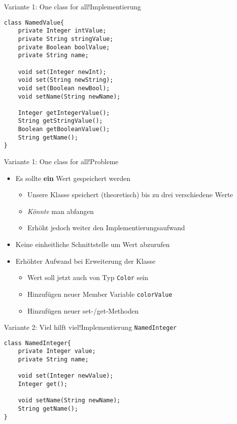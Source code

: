 \begin{frame}[fragile]{Variante 1: One class for all!}{Implementierung}
\lstset{style=javacode}
\begin{lstlisting}
class NamedValue{
    private Integer intValue;
    private String stringValue;
    private Boolean boolValue;
    private String name;

    void set(Integer newInt);
    void set(String newString);
    void set(Boolean newBool);
    void setName(String newName);

    Integer getIntegerValue();
    String getStringValue();
    Boolean getBooleanValue();
    String getName();
}
\end{lstlisting}
\end{frame}

\begin{frame}{Variante 1: One class for all!}{Probleme}
    \begin{itemize}
        \item Es sollte \textbf{ein} Wert gespeichert werden
            \begin{itemize}
                \item Unsere Klasse speichert (theoretisch) bis zu drei verschiedene Werte
                \item \textit{Könnte} man abfangen
                \item Erhöht jedoch weiter den Implementierungsaufwand
            \end{itemize}
            \item Keine einheitliche Schnittstelle um Wert abzurufen
            \item Erhöhter Aufwand bei Erweiterung der Klasse
            \begin{itemize}
                \item Wert soll jetzt auch von Typ \texttt{Color} sein
                \item Hinzufügen neuer Member Variable \texttt{colorValue}
                \item Hinzufügen neuer set-/get-Methoden
            \end{itemize}
    \end{itemize}
\end{frame}

\begin{frame}[fragile]{Variante 2: Viel hilft viel!}{Implementierung \texttt{NamedInteger}}
\lstset{style=javacode}
\begin{lstlisting}
class NamedInteger{
    private Integer value;
    private String name;
    
    void set(Integer newValue);
    Integer get();
    
    void setName(String newName);
    String getName();
}
\end{lstlisting}
\end{frame}

